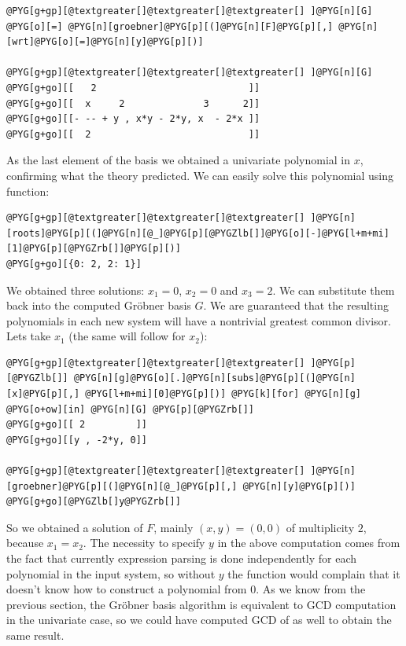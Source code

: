 \begin{Verbatim}[commandchars=@\[\]]
@PYG[g+gp][@textgreater[]@textgreater[]@textgreater[] ]@PYG[n][G] @PYG[o][=] @PYG[n][groebner]@PYG[p][(]@PYG[n][F]@PYG[p][,] @PYG[n][wrt]@PYG[o][=]@PYG[n][y]@PYG[p][)]

@PYG[g+gp][@textgreater[]@textgreater[]@textgreater[] ]@PYG[n][G]
@PYG[g+go][[   2                           ]]
@PYG[g+go][[  x     2              3      2]]
@PYG[g+go][[- -- + y , x*y - 2*y, x  - 2*x ]]
@PYG[g+go][[  2                            ]]
\end{Verbatim}
\noindent
As the last element of the basis we obtained a univariate polynomial in $x$, confirming what
the theory predicted. We can easily solve this polynomial using  function:

\begin{Verbatim}[commandchars=@\[\]]
@PYG[g+gp][@textgreater[]@textgreater[]@textgreater[] ]@PYG[n][roots]@PYG[p][(]@PYG[n][@_]@PYG[p][@PYGZlb[]]@PYG[o][-]@PYG[l+m+mi][1]@PYG[p][@PYGZrb[]]@PYG[p][)]
@PYG[g+go][{0: 2, 2: 1}]
\end{Verbatim}
\noindent
We obtained three solutions: $x_1 = 0$, $x_2 = 0$ and $x_3 = 2$. We can substitute them back
into the computed Gröbner basis $G$. We are guaranteed that the resulting polynomials in
each new system will have a nontrivial greatest common divisor. Lets take $x_1$ (the same
will follow for $x_2$):

\begin{Verbatim}[commandchars=@\[\]]
@PYG[g+gp][@textgreater[]@textgreater[]@textgreater[] ]@PYG[p][@PYGZlb[]] @PYG[n][g]@PYG[o][.]@PYG[n][subs]@PYG[p][(]@PYG[n][x]@PYG[p][,] @PYG[l+m+mi][0]@PYG[p][)] @PYG[k][for] @PYG[n][g] @PYG[o+ow][in] @PYG[n][G] @PYG[p][@PYGZrb[]]
@PYG[g+go][[ 2         ]]
@PYG[g+go][[y , -2*y, 0]]

@PYG[g+gp][@textgreater[]@textgreater[]@textgreater[] ]@PYG[n][groebner]@PYG[p][(]@PYG[n][@_]@PYG[p][,] @PYG[n][y]@PYG[p][)]
@PYG[g+go][@PYGZlb[]y@PYGZrb[]]
\end{Verbatim}
\noindent
So we obtained a solution of $F$, mainly $(x, y) = (0, 0)$ of multiplicity $2$, because
$x_1 = x_2$. The necessity to specify $y$ in the above computation comes from the fact
that currently expression parsing is done independently for each polynomial in the input
system, so without $y$ the function would complain that it doesn't know how to construct
a polynomial from $0$. As we know from the previous section, the Gröbner basis algorithm
is equivalent to GCD computation in the univariate case, so we could have computed GCD of
\code{{[}y**2, -2*y, 0{]}} as well to obtain the same result.

